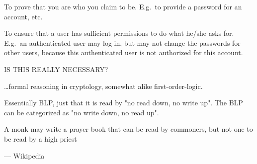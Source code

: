 \begin{definition}
\end{definition}

\begin{definition}[Authentication]
    To prove that you are who you claim to be. E.g.\ to provide a password
    for an account, etc.
\end{definition}

\begin{definition}[Authorization]

    To ensure that a user has sufficient permissions to do what he/she
    asks for. E.g.\ an authenticated user may log in, but may not
    change the passwords for other users, because this authenticated user
    is not authorized for this account.
\end{definition}

\begin{definition}
    IS THIS REALLY NECESSARY?

    \dots formal reasoning in cryptology, somewhat alike first-order-logic.
\end{definition}

\begin{definition}\label{biba}
    Essentially BLP, just that it is read by "no read down, no write up".
    The BLP can be categorized as "no write down, no read up".

    \epigraph{A monk may write a prayer book that can be read by commoners, 
    but not one to be read by a high priest}
    {--- \textup{Wikipedia}}

\end{definition}

